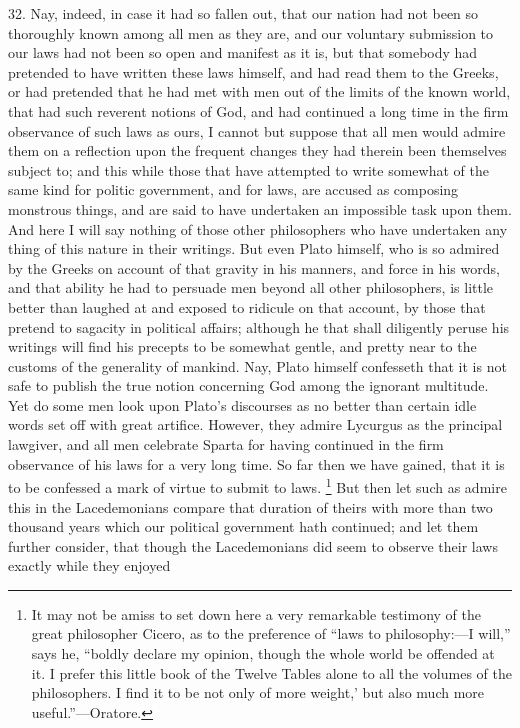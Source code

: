 32. Nay, indeed, in case it had so fallen out, that our nation had not
been so thoroughly known among all men as they are, and our voluntary
submission to our laws had not been so open and manifest as it is, but
that somebody had pretended to have written these laws himself, and had
read them to the Greeks, or had pretended that he had met with men out of
the limits of the known world, that had such reverent notions of God, and
had continued a long time in the firm observance of such laws as ours, I
cannot but suppose that all men would admire them on a reflection upon the
frequent changes they had therein been themselves subject to; and this
while those that have attempted to write somewhat of the same kind for
politic government, and for laws, are accused as composing monstrous
things, and are said to have undertaken an impossible task upon them. And
here I will say nothing of those other philosophers who have undertaken
any thing of this nature in their writings. But even Plato himself, who is
so admired by the Greeks on account of that gravity in his manners, and
force in his words, and that ability he had to persuade men beyond all
other philosophers, is little better than laughed at and exposed to
ridicule on that account, by those that pretend to sagacity in political
affairs; although he that shall diligently peruse his writings will find
his precepts to be somewhat gentle, and pretty near to the customs of the
generality of mankind. Nay, Plato himself confesseth that it is not safe
to publish the true notion concerning God among the ignorant multitude.
Yet do some men look upon Plato's discourses as no better than certain
idle words set off with great artifice. However, they admire Lycurgus as
the principal lawgiver, and all men celebrate Sparta for having continued
in the firm observance of his laws for a very long time. So far then we
have gained, that it is to be confessed a mark of virtue to submit to
laws. \footnote{It may not be amiss to
set down here a very remarkable testimony of the great philosopher Cicero,
as to the preference of ``laws to philosophy:—I will,'' says he,
``boldly declare my opinion, though the whole world be offended at it. I
prefer this little book of the Twelve Tables alone to all the volumes of
the philosophers. I find it to be not only of more weight,' but also much
more useful.''—Oratore.}
But then let such as admire this in the Lacedemonians compare that
duration of theirs with more than two thousand years which our political
government hath continued; and let them further consider, that though the
Lacedemonians did seem to observe their laws exactly while they enjoyed
